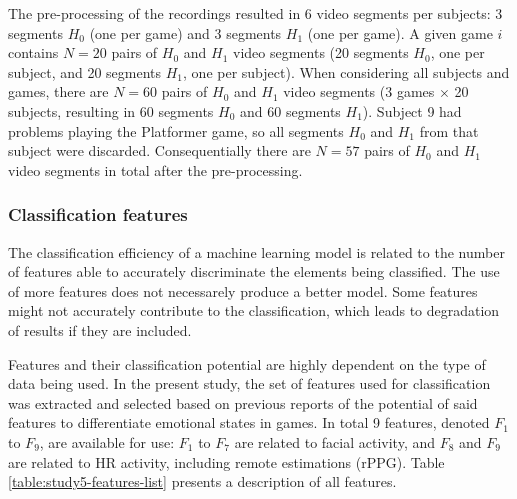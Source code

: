 The pre-processing of the recordings resulted in 6 video segments per subjects: 3 segments $H_0$ (one per game) and 3 segments $H_1$ (one per game). A given game $i$ contains $N=20$ pairs of $H_0$ and $H_1$ video segments (20 segments $H_0$, one per subject, and 20 segments $H_1$, one per subject). When considering all subjects and games, there are $N=60$ pairs of $H_0$ and $H_1$ video segments (3 games $\times$ 20 subjects, resulting in 60 segments $H_0$ and 60 segments $H_1$). Subject 9 had problems playing the Platformer game, so all segments $H_0$ and $H_1$ from that subject were discarded. Consequentially there are $N=57$ pairs of $H_0$ and $H_1$ video segments in total after the pre-processing.

\subsubsection{Classification features}

The classification efficiency of a machine learning model is related to the number of features able to accurately discriminate the elements being classified. The use of more features does not necessarely produce a better model. Some features might not accurately contribute to the classification, which leads to degradation of results if they are included.

Features and their classification potential are highly dependent on the type of data being used. In the present study, the set of features used for classification was extracted and selected based on previous reports of the potential of said features to differentiate emotional states in games. In total 9 features, denoted $F_1$ to $F_9$, are available for use: $F_1$ to $F_7$ are related to facial activity, and $F_8$ and $F_9$ are related to HR activity, including remote estimations (rPPG). Table \ref{table:study5-features-list} presents a description of all features.

